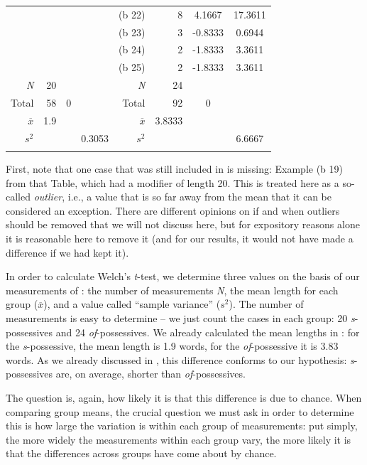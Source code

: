 \begin{table}
\begin{tabular}[t]{rrS[table-format=-1.1]crrS[table-format=-1.4]S[table-format=2.4]}
 & & & & (b 22) & 8 & 4.1667 & 17.3611 \\
 & & & & (b 23) & 3 & -0.8333 & 0.6944 \\
 & & & & (b 24) & 2 & -1.8333 & 3.3611 \\
 & & & & (b 25) & 2 & -1.8333 & 3.3611 \\
\midrule
\textit{N} & 20 & &  & \textit{N} & 24 & & \\
Total & 58 & 0 &  & Total & 92 & 0 & \\
$\overline{x}$ & 1.9 & & & $\overline{x}$ & 3.8333 & & \\
$s^2$ & & & 0.3053  & $s^2$ & & & 6.6667 \\
\lspbottomrule
\end{tabular}
\end{table}

First, note that one case that was still included in  is missing: Example (b 19) from that Table, which had a modifier of length  20. This is treated here as a so\hyp{}called \emph{outlier}, i.e., a value that is so far away from the mean that it can be considered an exception. There are different opinions on if and when outliers should be removed that we will not discuss here, but for expository reasons alone it is reasonable here to remove it (and for our results, it would not have made a difference if we had kept it).

In order to calculate Welch's \textit{t}-test,  we determine three values on the basis of our measurements  of :  the number of measurements \textit{N}, the mean  length for each group ($\overline{x}$), and a value called ``sample variance''  ($s^2$). The number of measurements is easy to determine -- we just count the cases in each group: 20 \textit{s}-possessives  and 24 \textit{of}-possessives. We already calculated the mean  lengths in : for the \textit{s}-possessive, the mean length  is 1.9 words, for the \textit{of}-possessive it is 3.83 words. As we already discussed in , this difference conforms to our hypothesis: \textit{s}-possessives are, on average, shorter than  \textit{of}-possessives.\largerpage

The question is, again, how likely it is that this difference is due to chance.  When comparing group means, the crucial question we must ask in order to determine this is how large the variation  is within each group of measurements:  put simply, the more widely the measurements within each group vary, the more likely it is that the differences across groups have come about by  chance.

